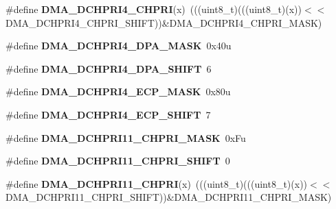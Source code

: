 \begin{DoxyCompactItemize}
\item 
\#define {\bfseries D\+M\+A\+\_\+\+D\+C\+H\+P\+R\+I4\+\_\+\+C\+H\+P\+RI}(x)~(((uint8\+\_\+t)(((uint8\+\_\+t)(x))$<$$<$D\+M\+A\+\_\+\+D\+C\+H\+P\+R\+I4\+\_\+\+C\+H\+P\+R\+I\+\_\+\+S\+H\+I\+FT))\&D\+M\+A\+\_\+\+D\+C\+H\+P\+R\+I4\+\_\+\+C\+H\+P\+R\+I\+\_\+\+M\+A\+SK)\hypertarget{group__DMA__Register__Masks_gabd84d94a94b70b261a2a49660f0035e9}{}\label{group__DMA__Register__Masks_gabd84d94a94b70b261a2a49660f0035e9}

\item 
\#define {\bfseries D\+M\+A\+\_\+\+D\+C\+H\+P\+R\+I4\+\_\+\+D\+P\+A\+\_\+\+M\+A\+SK}~0x40u\hypertarget{group__DMA__Register__Masks_gaf4a7bab4a376e47cbcc44e02cff09748}{}\label{group__DMA__Register__Masks_gaf4a7bab4a376e47cbcc44e02cff09748}

\item 
\#define {\bfseries D\+M\+A\+\_\+\+D\+C\+H\+P\+R\+I4\+\_\+\+D\+P\+A\+\_\+\+S\+H\+I\+FT}~6\hypertarget{group__DMA__Register__Masks_ga62b07715af664512e04bc2b02ca12993}{}\label{group__DMA__Register__Masks_ga62b07715af664512e04bc2b02ca12993}

\item 
\#define {\bfseries D\+M\+A\+\_\+\+D\+C\+H\+P\+R\+I4\+\_\+\+E\+C\+P\+\_\+\+M\+A\+SK}~0x80u\hypertarget{group__DMA__Register__Masks_ga1d848e32bb5131ea22811b9165d83d44}{}\label{group__DMA__Register__Masks_ga1d848e32bb5131ea22811b9165d83d44}

\item 
\#define {\bfseries D\+M\+A\+\_\+\+D\+C\+H\+P\+R\+I4\+\_\+\+E\+C\+P\+\_\+\+S\+H\+I\+FT}~7\hypertarget{group__DMA__Register__Masks_gac5f10de0dfe7e5561053741e9e38e371}{}\label{group__DMA__Register__Masks_gac5f10de0dfe7e5561053741e9e38e371}

\item 
\#define {\bfseries D\+M\+A\+\_\+\+D\+C\+H\+P\+R\+I11\+\_\+\+C\+H\+P\+R\+I\+\_\+\+M\+A\+SK}~0x\+Fu\hypertarget{group__DMA__Register__Masks_ga4b7b6d2e60a016af53e079b20cad7b99}{}\label{group__DMA__Register__Masks_ga4b7b6d2e60a016af53e079b20cad7b99}

\item 
\#define {\bfseries D\+M\+A\+\_\+\+D\+C\+H\+P\+R\+I11\+\_\+\+C\+H\+P\+R\+I\+\_\+\+S\+H\+I\+FT}~0\hypertarget{group__DMA__Register__Masks_ga832f65fc63433161ecd5d5ffdfbd125d}{}\label{group__DMA__Register__Masks_ga832f65fc63433161ecd5d5ffdfbd125d}

\item 
\#define {\bfseries D\+M\+A\+\_\+\+D\+C\+H\+P\+R\+I11\+\_\+\+C\+H\+P\+RI}(x)~(((uint8\+\_\+t)(((uint8\+\_\+t)(x))$<$$<$D\+M\+A\+\_\+\+D\+C\+H\+P\+R\+I11\+\_\+\+C\+H\+P\+R\+I\+\_\+\+S\+H\+I\+FT))\&D\+M\+A\+\_\+\+D\+C\+H\+P\+R\+I11\+\_\+\+C\+H\+P\+R\+I\+\_\+\+M\+A\+SK)\hypertarget{group__DMA__Register__Masks_gaec1d6da6f74d6a49cc3499e451acb9d6}{}\label{group__DMA__Register__Masks_gaec1d6da6f74d6a49cc3499e451acb9d6}


\end{DoxyCompactItemize}
